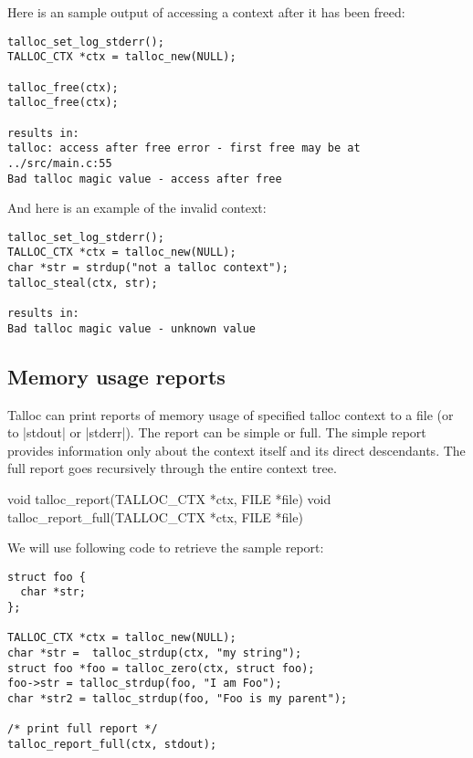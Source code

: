 Here is an sample output of accessing a context after it has been freed:

\begin{lstlisting}[caption={Talloc error -- access after free}]
talloc_set_log_stderr();
TALLOC_CTX *ctx = talloc_new(NULL);

talloc_free(ctx);
talloc_free(ctx);

results in:
talloc: access after free error - first free may be at ../src/main.c:55
Bad talloc magic value - access after free
\end{lstlisting}

\noindent
And here is an example of the invalid context:

\begin{lstlisting}[caption={Talloc error -- not a talloc context}]
talloc_set_log_stderr();
TALLOC_CTX *ctx = talloc_new(NULL);
char *str = strdup("not a talloc context");
talloc_steal(ctx, str);

results in:
Bad talloc magic value - unknown value
\end{lstlisting}

\subsection{Memory usage reports}

Talloc can print reports of memory usage of specified talloc context to a file
(or to |stdout| or |stderr|). The report can be simple or full. The simple
report provides information only about the context itself and its direct
descendants. The full report goes recursively through the entire context tree.

\begin{funcproto}
void talloc_report(TALLOC_CTX *ctx, FILE *file)
void talloc_report_full(TALLOC_CTX *ctx, FILE *file)
\end{funcproto}
\funclistend
We will use following code to retrieve the sample report:

\begin{lstlisting}[caption={Full report}]
struct foo {
  char *str;
};

TALLOC_CTX *ctx = talloc_new(NULL);
char *str =  talloc_strdup(ctx, "my string");
struct foo *foo = talloc_zero(ctx, struct foo);
foo->str = talloc_strdup(foo, "I am Foo");
char *str2 = talloc_strdup(foo, "Foo is my parent");

/* print full report */
talloc_report_full(ctx, stdout);
\end{lstlisting}

